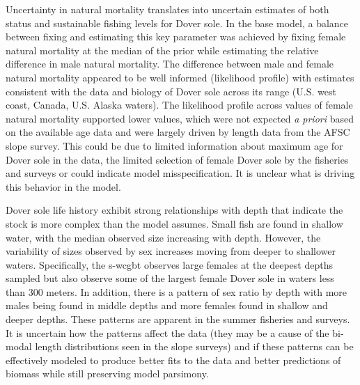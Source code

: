 \documentclass[11pt,
  english,
  a4paper,
]{article}
\begin{document}
\leavevmode\tagmcend\tagstructend\par


Uncertainty in natural mortality translates into uncertain estimates of both status and sustainable fishing levels for Dover sole. In the base model, a balance between fixing and estimating this key parameter was achieved by fixing female natural mortality at the median of the prior while estimating the relative difference in male natural mortality. The difference between male and female natural mortality appeared to be well informed (likelihood profile) with estimates consistent with the data and biology of Dover sole across its range (U.S. west coast, Canada, U.S. Alaska waters). The likelihood profile across values of female natural mortality supported lower values, which were not expected \emph{a priori} based on the available age data and were largely driven by length data from the AFSC slope survey. This could be due to limited information about maximum age for Dover sole in the data, the limited selection of female Dover sole by the fisheries and surveys or could indicate model misspecification. It is unclear what is driving this behavior in the model.

\leavevmode\tagmcend\tagstructend\par


Dover sole life history exhibit strong relationships with depth that indicate the stock is more complex than the model assumes. Small fish are found in shallow water, with the median observed size increasing with depth. However, the variability of sizes observed by sex increases moving from deeper to shallower waters. Specifically, the \gls{s-wcgbt} observes large females at the deepest depths sampled but also observe some of the largest female Dover sole in waters less than 300 meters. In addition, there is a pattern of sex ratio by depth with more males being found in middle depths and more females found in shallow and deeper depths. These patterns are apparent in the summer fisheries and surveys. It is uncertain how the patterns affect the data (they may be a cause of the bi-modal length distributions seen in the slope surveys) and if these patterns can be effectively modeled to produce better fits to the data and better predictions of biomass while still preserving model parsimony.

\leavevmode\tagmcend\tagstructend\par
\end{document}
